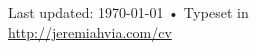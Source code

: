 \documentclass[10pt, a4paper]{article}
\begin{document}
\vfill{}
\begin{center}
  {\scriptsize  Last updated: \today\- •\-
    Typeset in \href{http://nitens.org/taraborelli/cvtex}{
      \XeTeX }\\
    \href{http://jeremiahvia.com/cv/cv.pdf}{http://jeremiahvia.com/cv}}
\end{center}
\end{document}
